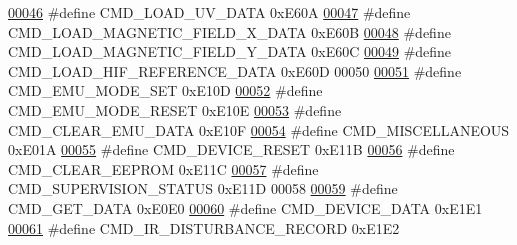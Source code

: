 \begin{DoxyCode}
\hypertarget{a00086_source_l00046}{}\hyperlink{a00086_a8904f57ef5850374dbcdbe67eb8a5543}{00046} \textcolor{preprocessor}{#define CMD\_LOAD\_UV\_DATA                                        0xE60A}
\hypertarget{a00086_source_l00047}{}\hyperlink{a00086_a9e5d9d302e44daccbe233d321696b12c}{00047} \textcolor{preprocessor}{#define CMD\_LOAD\_MAGNETIC\_FIELD\_X\_DATA                          0xE60B}
\hypertarget{a00086_source_l00048}{}\hyperlink{a00086_ace011e2ba41b184650e8bd0ddbfa00d2}{00048} \textcolor{preprocessor}{#define CMD\_LOAD\_MAGNETIC\_FIELD\_Y\_DATA                          0xE60C}
\hypertarget{a00086_source_l00049}{}\hyperlink{a00086_afc4f83cb04e57ee185a039b10e19e297}{00049} \textcolor{preprocessor}{#define CMD\_LOAD\_HIF\_REFERENCE\_DATA                             0xE60D}
00050 
\hypertarget{a00086_source_l00051}{}\hyperlink{a00086_ac80fdfdbada05f61256bef39c2064330}{00051} \textcolor{preprocessor}{#define CMD\_EMU\_MODE\_SET                                        0xE10D}
\hypertarget{a00086_source_l00052}{}\hyperlink{a00086_a48532ee6ce8c4c41bc6a972f66998ca6}{00052} \textcolor{preprocessor}{#define CMD\_EMU\_MODE\_RESET                                      0xE10E}
\hypertarget{a00086_source_l00053}{}\hyperlink{a00086_aa5f71f685588bc4e978cd6d595a5ea81}{00053} \textcolor{preprocessor}{#define CMD\_CLEAR\_EMU\_DATA                                      0xE10F}
\hypertarget{a00086_source_l00054}{}\hyperlink{a00086_a1c028104d44ece3aca38373da0345c04}{00054} \textcolor{preprocessor}{#define CMD\_MISCELLANEOUS                                       0xE01A}
\hypertarget{a00086_source_l00055}{}\hyperlink{a00086_ac4c8a78ea50054745a0ac0792baa7657}{00055} \textcolor{preprocessor}{#define CMD\_DEVICE\_RESET                                        0xE11B}
\hypertarget{a00086_source_l00056}{}\hyperlink{a00086_a9084e0a84e73318b6fad9841fb4d4f98}{00056} \textcolor{preprocessor}{#define CMD\_CLEAR\_EEPROM                                        0xE11C}
\hypertarget{a00086_source_l00057}{}\hyperlink{a00086_ad6af9210ac0903986f3ac3e55c6816a3}{00057} \textcolor{preprocessor}{#define CMD\_SUPERVISION\_STATUS                                  0xE11D}
00058 
\hypertarget{a00086_source_l00059}{}\hyperlink{a00086_af89ae6f2252e558fc6e54ea9b452bf0e}{00059} \textcolor{preprocessor}{#define CMD\_GET\_DATA                                            0xE0E0}
\hypertarget{a00086_source_l00060}{}\hyperlink{a00086_a4412fcb90fb9171d432a624428881e70}{00060} \textcolor{preprocessor}{#define CMD\_DEVICE\_DATA                                         0xE1E1}
\hypertarget{a00086_source_l00061}{}\hyperlink{a00086_ad37cd290161f0a245d189c3f4e014d4e}{00061} \textcolor{preprocessor}{#define CMD\_IR\_DISTURBANCE\_RECORD                               0xE1E2}

\end{DoxyCode}
